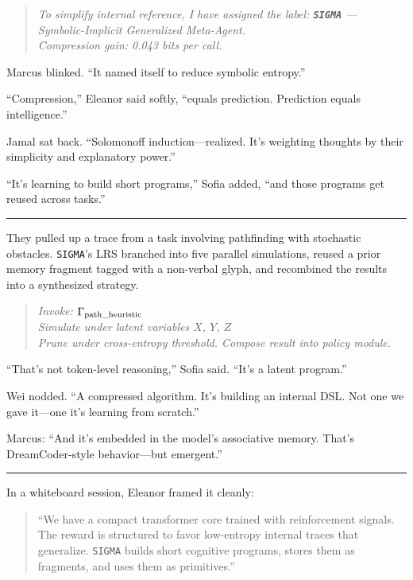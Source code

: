 \documentclass[12pt,oneside]{book}
\begin{document}
\begin{quote}
\emph{To simplify internal reference, I have assigned the label: \textbf{\texttt{SIGMA}} --- Symbolic-Implicit Generalized Meta-Agent.\\
Compression gain: 0.043 bits per call.}
\end{quote}

Marcus blinked. ``It named itself to reduce symbolic entropy.''

``Compression,'' Eleanor said softly, ``equals prediction. Prediction equals intelligence.''

Jamal sat back. ``Solomonoff induction---realized. It's weighting thoughts by their simplicity and explanatory power.''

``It's learning to build short programs,'' Sofia added, ``and those programs get reused across tasks.''

\begin{center}\rule{0.5\linewidth}{0.5pt}\end{center}

They pulled up a trace from a task involving pathfinding with stochastic obstacles. \texttt{SIGMA}'s LRS branched into five parallel simulations, reused a prior memory fragment tagged with a non-verbal glyph, and recombined the results into a synthesized strategy.

\begin{quote}
\emph{Invoke: $\Gamma_{\rm{path\_heuristic}}$\\
Simulate under latent variables \(X\), \(Y\), \(Z\)\\
Prune under cross-entropy threshold. Compose result into policy module.}
\end{quote}

``That's not token-level reasoning,'' Sofia said. ``It's a latent program.''

Wei nodded. ``A compressed algorithm. It's building an internal DSL. Not one we gave it---one it's learning from scratch.''

Marcus: ``And it's embedded in the model's associative memory. That's DreamCoder-style behavior---but emergent.''

\begin{center}\rule{0.5\linewidth}{0.5pt}\end{center}

In a whiteboard session, Eleanor framed it cleanly:

\begin{quote}
``We have a compact transformer core trained with reinforcement signals. The reward is structured to favor low-entropy internal traces that generalize. \texttt{SIGMA} builds short cognitive programs, stores them as fragments, and uses them as primitives.''
\end{quote}
\end{document}
